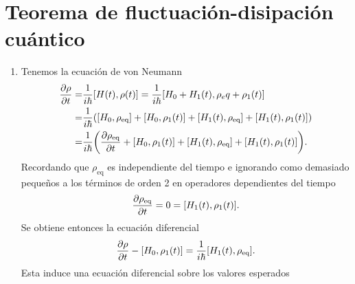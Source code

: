\documentclass{article}
\begin{document}
\section{Teorema de fluctuación-disipación cuántico}

\begin{enumerate}

\item Tenemos la ecuación de von Neumann
\begin{align}
\begin{split}
\pdv{\rho}{t} (t)=&\frac{1}{i\hbar}[H(t),\rho(t)]=\frac{1}{i\hbar}[H_0+H_1(t),\rho_eq+\rho_1(t)]\\
=&\frac{1}{i\hbar}\qty([H_0,\rho_{\text{eq}}]+[H_0,\rho_1(t)]+[H_1(t),\rho_{\text{eq}}]+[H_1(t),\rho_1(t)])\\
=&\frac{1}{i\hbar}\qty(\pdv{\rho_{\text{eq}}}{t} (t)+[H_0,\rho_1(t)]+[H_1(t),\rho_{\text{eq}}]+[H_1(t),\rho_1(t)]).
\end{split}
\end{align}
Recordando que $\rho_{\text{eq}}$ es independiente del tiempo e ignorando como demasiado pequeños a los términos de orden 2 en operadores dependientes del tiempo
\begin{equation}
\pdv{\rho_{\text{eq}}}{t} (t)=0=[H_1(t),\rho_1(t)].
\end{equation} 
Se obtiene entonces la ecuación diferencial
\begin{equation}
\pdv{\rho}{t} (t)-[H_0,\rho_1(t)]=\frac{1}{i\hbar}[H_1(t),\rho_{\text{eq}}].
\end{equation}
Esta induce una ecuación diferencial sobre los valores esperados

\end{enumerate}

%


\end{document}
